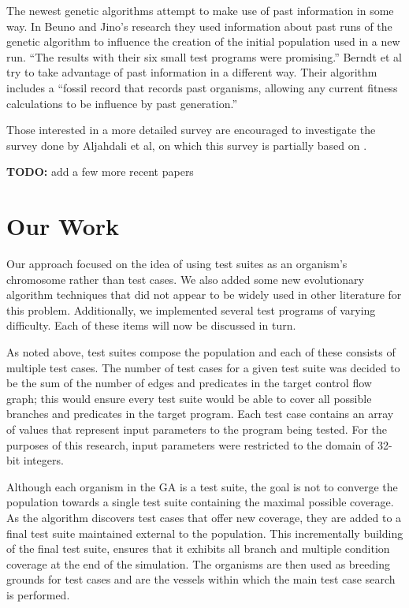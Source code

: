 \documentclass[runningheads]{llncs}
\begin{document}
The newest genetic algorithms attempt to make use of past information in some way. In Beuno and Jino's research they used information about past runs of the genetic algorithm to influence the creation of the initial population used in a new run\cite{limits6}. ``The results with their six small test programs were promising.''\cite{limits6} Berndt et al try to take advantage of past information in a different way. Their algorithm includes a ``fossil record that records past organisms, allowing any current fitness calculations to be influence by past generation.''\cite{limits6}

Those interested in a more detailed survey are encouraged to investigate the survey done by Aljahdali et al, on which this survey is partially based on \cite{limits6}.

\textbf{TODO:} add a few more recent papers




\newpage
\section{Our Work}
Our approach focused on the idea of using test suites as an organism's chromosome rather than test cases. We also added some new evolutionary algorithm techniques that did not appear to be widely used in other literature for this problem. Additionally, we implemented several test programs of varying difficulty. Each of these items will now be discussed in turn.

As noted above, test suites compose the population and each of these consists of multiple test cases. The number of test cases for a given test suite was decided to be the sum of the number of edges and predicates in the target control flow graph; this would ensure every test suite would be able to cover all possible branches and predicates in the target program. Each test case contains an array of values that represent input parameters to the program being tested. For the purposes of this research, input parameters were restricted to the domain of 32-bit integers.

Although each organism in the GA is a test suite, the goal is not to converge the population towards a single test suite containing the maximal possible coverage. As the algorithm discovers test cases that offer new coverage, they are added to a final test suite maintained external to the population. This incrementally building of the final test suite, ensures that it exhibits all branch and multiple condition coverage at the end of the simulation. The organisms are then used as breeding grounds for test cases and are the vessels within which the main test case search is performed. 
\end{document}
